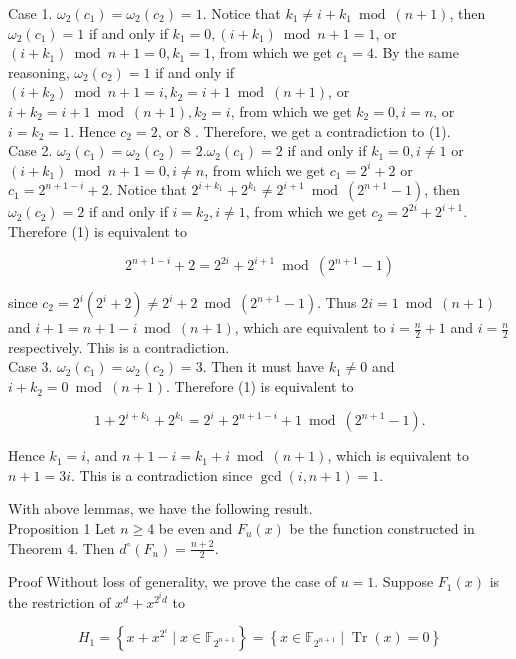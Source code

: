 \documentclass[10pt]{article}
\begin{document}
Case 1. $\omega_{2}\left(c_{1}\right)=\omega_{2}\left(c_{2}\right)=1$. Notice that $k_{1} \neq i+k_{1} \bmod (n+1)$, then $\omega_{2}\left(c_{1}\right)=1$ if and only if $k_{1}=0,\left(i+k_{1}\right) \bmod n+1=1$, or $\left(i+k_{1}\right) \bmod n+1=0, k_{1}=1$, from which we get $c_{1}=4$. By the same reasoning, $\omega_{2}\left(c_{2}\right)=1$ if and only if $\left(i+k_{2}\right) \bmod n+1=i, k_{2}=i+1 \bmod (n+1)$, or $i+k_{2}=i+1 \bmod (n+1), k_{2}=i$, from which we get $k_{2}=0, i=n$, or $i=k_{2}=1$. Hence $c_{2}=2$, or 8 . Therefore, we get a contradiction to (1).\\
Case 2. $\omega_{2}\left(c_{1}\right)=\omega_{2}\left(c_{2}\right)=2 . \omega_{2}\left(c_{1}\right)=2$ if and only if $k_{1}=0, i \neq 1$ or $\left(i+k_{1}\right) \bmod n+ 1=0, i \neq n$, from which we get $c_{1}=2^{i}+2$ or $c_{1}=2^{n+1-i}+2$. Notice that $2^{i+k_{1}}+2^{k_{1}} \neq 2^{i+1} \bmod \left(2^{n+1}-1\right)$, then $\omega_{2}\left(c_{2}\right)=2$ if and only if $i=k_{2}, i \neq 1$, from which we get $c_{2}=2^{2 i}+2^{i+1}$. Therefore (1) is equivalent to

$$
2^{n+1-i}+2=2^{2 i}+2^{i+1} \bmod \left(2^{n+1}-1\right)
$$

since $c_{2}=2^{i}\left(2^{i}+2\right) \neq 2^{i}+2 \bmod \left(2^{n+1}-1\right)$. Thus $2 i=1 \bmod (n+1)$ and $i+1=n+1-i \bmod (n+1)$, which are equivalent to $i=\frac{n}{2}+1$ and $i=\frac{n}{2}$ respectively. This is a contradiction.\\
Case 3. $\omega_{2}\left(c_{1}\right)=\omega_{2}\left(c_{2}\right)=3$. Then it must have $k_{1} \neq 0$ and $i+k_{2}=0 \bmod (n+1)$. Therefore (1) is equivalent to

$$
1+2^{i+k_{1}}+2^{k_{1}}=2^{i}+2^{n+1-i}+1 \bmod \left(2^{n+1}-1\right) .
$$

Hence $k_{1}=i$, and $n+1-i=k_{1}+i \bmod (n+1)$, which is equivalent to $n+1=3 i$. This is a contradiction since $\operatorname{gcd}(i, n+1)=1$.

With above lemmas, we have the following result.\\
Proposition 1 Let $n \geq 4$ be even and $F_{u}(x)$ be the function constructed in Theorem 4. Then $d^{\circ}\left(F_{u}\right)=\frac{n+2}{2}$.

Proof Without loss of generality, we prove the case of $u=1$. Suppose $F_{1}(x)$ is the restriction of $x^{d}+x^{2^{i} d}$ to

$$
H_{1}=\left\{x+x^{2^{i}} \mid x \in \mathbb{F}_{2^{n+1}}\right\}=\left\{x \in \mathbb{F}_{2^{n+1}} \mid \operatorname{Tr}(x)=0\right\}
$$
\end{document}

